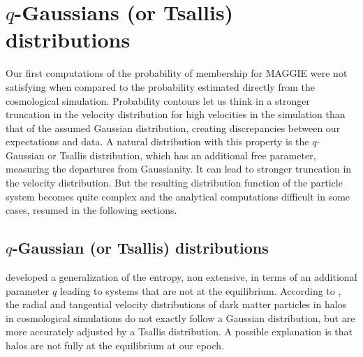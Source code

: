 \chapter{$q$-Gaussians (or Tsallis) distributions}
\label{cha:q_gaussians_or_tsallis_distributions}
\minitoc%

Our first computations of the probability of membership for MAGGIE were not
satisfying when compared to the probability estimated directly from the
cosmological simulation. Probability contours let us think in a stronger
truncation in the velocity distribution for high velocities in the simulation
than that of the assumed Gaussian distribution, creating discrepancies between
our expectations and data. A natural distribution with this property is the
$q$-Gaussian or Tsallis distribution, which has an additional free parameter,
measuring the departures from Gaussianity. It can lead to stronger truncation
in the velocity distribution. But the resulting distribution function of the
particle system becomes quite complex and the analytical computations difficult
in some cases, resumed in the following sections.

\section{$q$-Gaussian (or Tsallis) distributions}
\label{sec:q_gaussian_or_tsallis_distributions}

\citet{Tsallis+88} developed a generalization of the entropy, non extensive,
in terms of an additional parameter $q$ leading to systems that are not at
the equilibrium. According to \citet{Hansen+06}, the radial and tangential
velocity distributions of dark matter particles in halos in cosmological
simulations do not exactly follow a Gaussian distribution, but are more
accurately adjusted by a Tsallis distribution. A possible explanation is
that halos are not fully at the equilibrium at our epoch.

